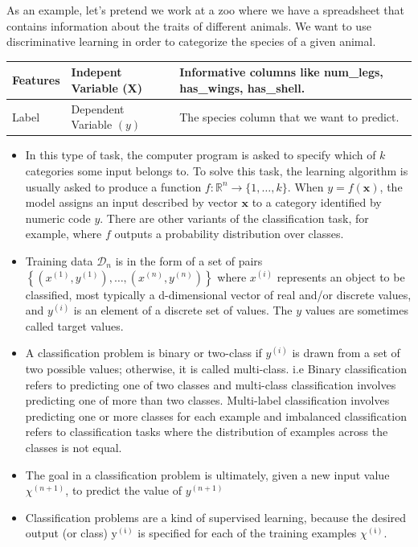 \documentclass[openany]{book}
\begin{document}
As an example, let's pretend we work at a zoo where we have a spreadsheet that contains information about the traits of different animals. We want to use discriminative learning in order to categorize the species of a given animal.

\begin{tabular}{|l|l|l|}
\hline Features & Indepent Variable (X) & Informative columns like num\_legs, has\_wings, has\_shell. \\
\hline Label & Dependent Variable $(y)$ & The species column that we want to predict. \\
\hline
\end{tabular}



\begin{itemize}
    \item In this type of task, the computer program is asked to specify which of $k$ categories some input belongs to. To solve this task, the learning algorithm is usually asked to produce a function $f: \mathbb{R}^{n} \rightarrow\{1, \ldots, k\} .$ When $y=f(\boldsymbol{x})$, the model assigns an input described by vector $\boldsymbol{x}$ to a category identified by numeric code $y$. There are other variants of the classification task, for example, where $f$ outputs a probability distribution over classes.
 
    \item Training data $\mathcal{D}_{n}$ is in the form of a set of pairs $\left\{\left(x^{(1)}, y^{(1)}\right), \ldots,\left(x^{(n)}, y^{(n)}\right)\right\}$ where $x^{(i)}$ represents an object to be classified, most typically a d-dimensional vector of real and/or discrete values, and $y^{(i)}$ is an element of a discrete set of values. The $y$ values are sometimes called target values.

    \item A classification problem is binary or two-class if $y^{(i)}$ is drawn from a set of two possible values; otherwise, it is called multi-class. i.e Binary classification refers to predicting one of two classes and multi-class classification involves predicting one of more than two classes. Multi-label classification involves predicting one or more classes for each example and imbalanced classification refers to classification tasks where the distribution of examples across the classes is not equal.


    \item The goal in a classification problem is ultimately, given a new input value $\chi^{(n+1)}$, to predict the value of $y^{(n+1)}$

    \item Classification problems are a kind of supervised learning, because the desired output (or class) $\mathrm{y}^{(\mathfrak{i})}$ is specified for each of the training examples $\chi^{(\mathfrak{i})}$.
    

\end{itemize}
\end{document}
